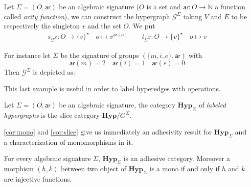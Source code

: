 \documentclass[runningheads,envcountsect]{lmcs}
\newcommand{\hyp}{\catname{Hyp}}
\newcommand{\hyps}{\catname{Hyp}_{\Sigma}}
\newcommand{\catname}[1]{\mathbf{#1}}
\newcommand{\ari}[0]{\mathsf{ar}}
\theoremstyle{plain}
\theoremstyle{definition}
\begin{document}
\begin{exa}\label{exa_3} Let $\Sigma=(O, \ari)$ be an algebraic signature ($O$ is a set and $\ari:O\rightarrow \mathbb{N}$ a function called \emph{arity function}), we can construct the hypergraph $\mathcal{G}^\Sigma$ taking $V$ and $E$ to be respectively the singleton ${v}$ and the set $O$. We put
	\begin{align*}
s_{\mathcal{G}^\Sigma}:O\to \{v\}^\star \quad o\mapsto v^{\ari(o)}
\qquad 
t_{\mathcal{G}^\Sigma}:O\to \{v\}^\star \quad o\mapsto v
\end{align*}
	
	For instance let $\Sigma$ be the signature of groups $(\{m, i, e \}, \ari)$ with
	\[\ari(m)=2 \quad \ari(i)=1 \quad \ari(e)=0\]	
	Then $\mathcal{G}^\Sigma$ is depicted as:
	\begin{center}
	\end{center}
\end{exa}

This last example is useful in order to label hyperedges with operations.
\begin{defi}Let $\Sigma=(O, \ari)$ be an algebraic signature, the category $\hyps$ of \emph{labeled hypergraphs} is the slice category $\hyp/G^\Sigma$.
\end{defi}
\cref{cor:mono} and \cref{cor:slice} give us immediately an adhesivity result for $\hyp_{\Sigma}$ and a characterization of monomorphisms in it.
\begin{prop}\label{prop:mono}
	For every algebraic signature $\Sigma$, $\hyps$ is an adhesive category. Moreover a morphism $(h,k)$ between two object of $\hyp_{\Sigma}$ is a mono if and only if $h$ and $k$ are injective functions.
\end{prop}
\end{document}
